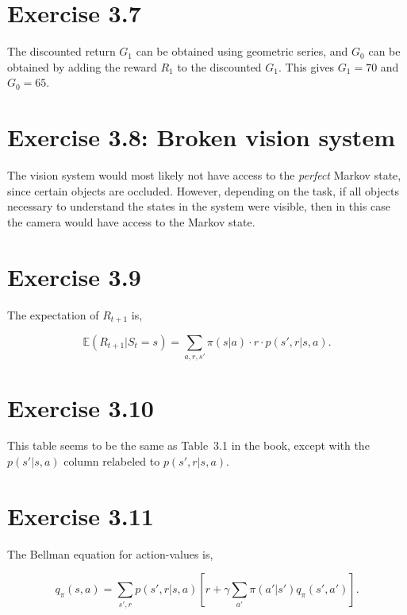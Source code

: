 \documentclass[a4paper, 12pt, titlepage]{article}
\begin{document}
\section{Exercise 3.7}

The discounted return $G_1$ can be obtained using geometric series, and $G_0$
can be obtained by adding the reward $R_1$ to the discounted $G_1$. This gives
$G_1 = 70$ and $G_0 = 65$.


\section{Exercise 3.8: Broken vision system}

The vision system would most likely not have access to the \emph{perfect}
Markov state, since certain objects are occluded. However, depending on the
task, if all objects necessary to understand the states in the system were
visible, then in this case the camera would have access to the Markov state.


\section{Exercise 3.9}

The expectation of $R_{t + 1}$ is,

\begin{equation*}
        \mathbb{E}\left(R_{t + 1} | S_t = s\right) =
                \sum_{a, r, s'} \pi(s | a) \cdot r \cdot p(s', r | s, a).
\end{equation*}


\section{Exercise 3.10}

This table seems to be the same as Table~3.1 in the book, except with the
$p(s' | s, a)$ column relabeled to $p(s', r | s, a)$.


\section{Exercise 3.11}

The Bellman equation for action-values is,

\begin{equation*}
        q_{\pi}(s, a) = \sum_{s', r} p(s', r | s, a)
                \left[r + \gamma \sum_{a'} \pi(a' | s') q_{\pi}(s', a')\right].
\end{equation*}
\end{document}
